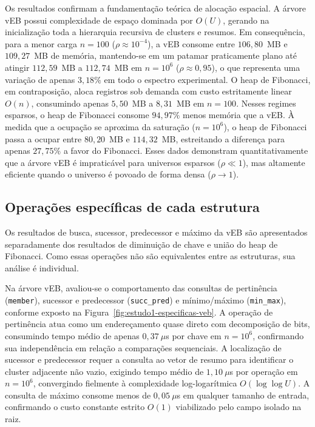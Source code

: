 \documentclass[12pt,a4paper]{report}
\begin{document}
Os resultados confirmam a fundamentação teórica de alocação espacial. A árvore vEB possui complexidade de espaço dominada por $O(U)$, gerando na inicialização toda a hierarquia recursiva de clusters e resumos. Em consequência, para a menor carga $n = 100$ ($\rho \approx 10^{-4}$), a vEB consome entre $106{,}80$~MB e $109{,}27$~MB de memória, mantendo-se em um patamar praticamente plano até atingir $112{,}59$~MB a $112{,}74$~MB em $n = 10^6$ ($\rho \approx 0{,}95$), o que representa uma variação de apenas $3,18\%$ em todo o espectro experimental. O heap de Fibonacci, em contraposição, aloca registros sob demanda com custo estritamente linear $O(n)$, consumindo apenas $5{,}50$~MB a $8{,}31$~MB em $n = 100$. Nesses regimes esparsos, o heap de Fibonacci consome $94{,}97\%$ menos memória que a vEB. À medida que a ocupação se aproxima da saturação ($n = 10^6$), o heap de Fibonacci passa a ocupar entre $80{,}20$~MB e $114{,}32$~MB, estreitando a diferença para apenas $27{,}75\%$ a favor do Fibonacci. Esses dados demonstram quantitativamente que a árvore vEB é impraticável para universos esparsos ($\rho \ll 1$), mas altamente eficiente quando o universo é povoado de forma densa ($\rho \to 1$).

\subsection{Operações específicas de cada estrutura}

Os resultados de busca, sucessor, predecessor e máximo da vEB são apresentados separadamente dos resultados de diminuição de chave e união do heap de Fibonacci. Como essas operações não são equivalentes entre as estruturas, sua análise é individual.

Na árvore vEB, avaliou-se o comportamento das consultas de pertinência (\texttt{member}), sucessor e predecessor (\texttt{succ\_pred}) e mínimo/máximo (\texttt{min\_max}), conforme exposto na Figura~\ref{fig:estudo1-especificas-veb}. A operação de pertinência atua como um endereçamento quase direto com decomposição de bits, consumindo tempo médio de apenas $0{,}37~\mu$s por chave em $n = 10^6$, confirmando sua independência em relação a comparações sequenciais. A localização de sucessor e predecessor requer a consulta ao vetor de resumo para identificar o cluster adjacente não vazio, exigindo tempo médio de $1{,}10~\mu$s por operação em $n = 10^6$, convergindo fielmente à complexidade log-logarítmica $O(\log \log U)$. A consulta de máximo consome menos de $0{,}05~\mu$s em qualquer tamanho de entrada, confirmando o custo constante estrito $O(1)$ viabilizado pelo campo isolado na raiz.
\end{document}
